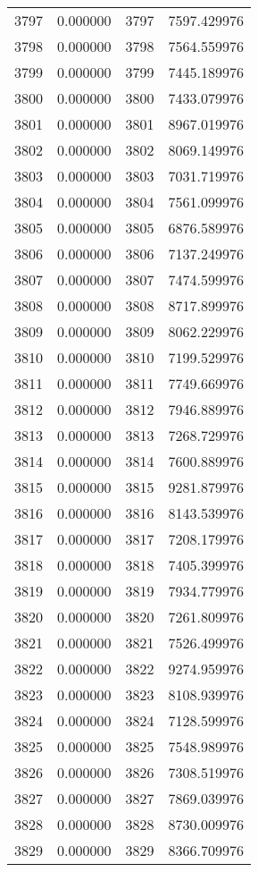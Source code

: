 \documentclass[12pt]{article}
\begin{document}
\begin{longtable}{@{}cccc@{}}
3797 & 0.000000 & 3797 & 7597.429976 \\
3798 & 0.000000 & 3798 & 7564.559976 \\
3799 & 0.000000 & 3799 & 7445.189976 \\
3800 & 0.000000 & 3800 & 7433.079976 \\
3801 & 0.000000 & 3801 & 8967.019976 \\
3802 & 0.000000 & 3802 & 8069.149976 \\
3803 & 0.000000 & 3803 & 7031.719976 \\
3804 & 0.000000 & 3804 & 7561.099976 \\
3805 & 0.000000 & 3805 & 6876.589976 \\
3806 & 0.000000 & 3806 & 7137.249976 \\
3807 & 0.000000 & 3807 & 7474.599976 \\
3808 & 0.000000 & 3808 & 8717.899976 \\
3809 & 0.000000 & 3809 & 8062.229976 \\
3810 & 0.000000 & 3810 & 7199.529976 \\
3811 & 0.000000 & 3811 & 7749.669976 \\
3812 & 0.000000 & 3812 & 7946.889976 \\
3813 & 0.000000 & 3813 & 7268.729976 \\
3814 & 0.000000 & 3814 & 7600.889976 \\
3815 & 0.000000 & 3815 & 9281.879976 \\
3816 & 0.000000 & 3816 & 8143.539976 \\
3817 & 0.000000 & 3817 & 7208.179976 \\
3818 & 0.000000 & 3818 & 7405.399976 \\
3819 & 0.000000 & 3819 & 7934.779976 \\
3820 & 0.000000 & 3820 & 7261.809976 \\
3821 & 0.000000 & 3821 & 7526.499976 \\
3822 & 0.000000 & 3822 & 9274.959976 \\
3823 & 0.000000 & 3823 & 8108.939976 \\
3824 & 0.000000 & 3824 & 7128.599976 \\
3825 & 0.000000 & 3825 & 7548.989976 \\
3826 & 0.000000 & 3826 & 7308.519976 \\
3827 & 0.000000 & 3827 & 7869.039976 \\
3828 & 0.000000 & 3828 & 8730.009976 \\
3829 & 0.000000 & 3829 & 8366.709976 \\

\end{longtable}
\end{document}
